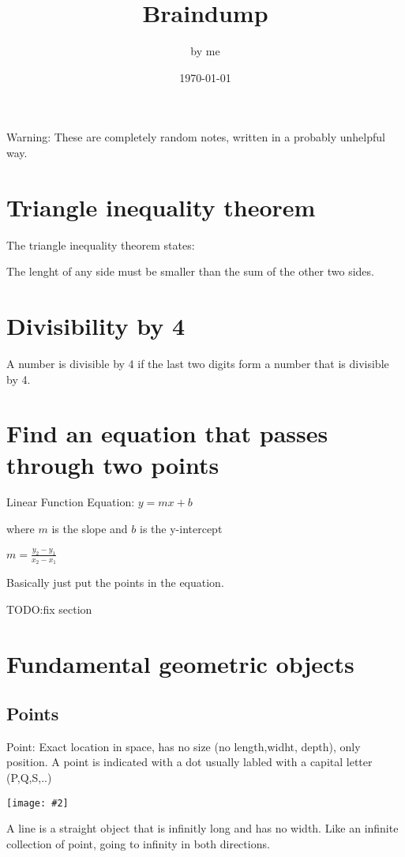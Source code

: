 \documentclass{article}
\title{Braindump}
\author{by me}
\date{\today}
\newcommand{\img}[2][]{\texttt{[image: \#2]}}
\begin{document}
\maketitle

Warning: These are completely random notes, written in a probably unhelpful way.

\tableofcontents

\section{Triangle inequality theorem}

The triangle inequality theorem states:

The lenght of any side must be smaller than the sum of the other two sides.

\section{Divisibility by 4}

A number is divisible by 4 if the last two digits form a number that is divisible by 4.

\section{Find an equation that passes through two points}

Linear Function Equation:
$y=mx+b$

where $m$ is the slope and $b$ is the y-intercept

$m=\frac{y_2-y_1}{x_2-x_1}$


Basically just put the points in the equation.

TODO:fix section

\section{Fundamental geometric objects}

\subsection{Points}
Point: Exact location in space, has no size (no length,widht, depth), only position.
A point is indicated with a dot usually labled with a capital letter (P,Q,S,..)

\img{points.png}

A line is a straight object that is infinitly long and has no width. Like an infinite collection of point, going to infinity in both directions.
\end{document}

